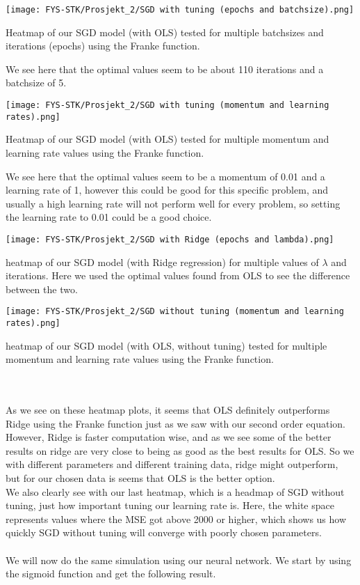 \documentclass[english,notitlepage,reprint,nofootinbib]{revtex4-1}  %
\begin{document}
\texttt{[image: FYS-STK/Prosjekt\_2/SGD with tuning (epochs and batchsize).png]}
\caption{Heatmap of our SGD model (with OLS) tested for multiple batchsizes and iterations (epochs) using the Franke function.}
We see here that the optimal values seem to be about 110 iterations and a batchsize of 5.


\texttt{[image: FYS-STK/Prosjekt\_2/SGD with tuning (momentum and learning rates).png]}
\caption{Heatmap of our SGD model (with OLS) tested for multiple momentum and learning rate values using the Franke function.}
We see here that the optimal values seem to be a momentum of 0.01 and a learning rate of 1, however this could be good for this specific problem, and usually a high learning rate will not perform well for every problem, so setting the learning rate to 0.01 could be a good choice.

\texttt{[image: FYS-STK/Prosjekt\_2/SGD with Ridge (epochs and lambda).png]}
\caption{heatmap of our SGD model (with Ridge regression) for multiple values of $\lambda$ and iterations. Here we used the optimal values found from OLS to see the difference between the two.}

\texttt{[image: FYS-STK/Prosjekt\_2/SGD without tuning (momentum and learning rates).png]}
\caption{heatmap of our SGD model (with OLS, without tuning) tested for multiple momentum and learning rate values using the Franke function.}
\\
\\
As we see on these heatmap plots, it seems that OLS definitely outperforms Ridge using the Franke function just as we saw with our second order equation. However, Ridge is faster computation wise, and as we see some of the better results on ridge are very close to being as good as the best results for OLS. So we with different parameters and different training data, ridge might outperform, but for our chosen data is seems that OLS is the better option. 
\\
We also clearly see with our last heatmap, which is a headmap of SGD without tuning, just how important tuning our learning rate is. Here, the white space represents values where the MSE got above 2000 or higher, which shows us how quickly SGD without tuning will converge with poorly chosen parameters.
\\
\\
We will now do the same simulation using our neural network. We start by using the sigmoid function and get the following result.
\end{document}
